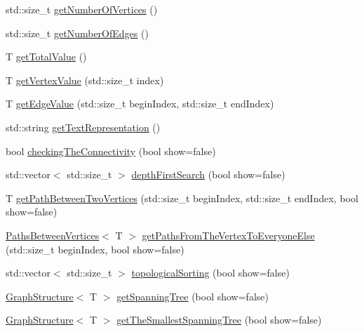 \begin{DoxyCompactItemize}
std\+::size\+\_\+t \mbox{\hyperlink{classgs_1_1_graph_structure_a973bb790243cd98bceac6188a79f47d6}{get\+Number\+Of\+Vertices}} ()
\item 
std\+::size\+\_\+t \mbox{\hyperlink{classgs_1_1_graph_structure_ab7f63de5d83e392689eb9e10f776c848}{get\+Number\+Of\+Edges}} ()
\item 
T \mbox{\hyperlink{classgs_1_1_graph_structure_a430f8d15cb01da7f7c7054b7a9e831ee}{get\+Total\+Value}} ()
\item 
T \mbox{\hyperlink{classgs_1_1_graph_structure_a0adafe2cbe3eb635da12957b9b0ad803}{get\+Vertex\+Value}} (std\+::size\+\_\+t index)
\item 
T \mbox{\hyperlink{classgs_1_1_graph_structure_ac2e23f51a131b5a08d96cb8c75f20cea}{get\+Edge\+Value}} (std\+::size\+\_\+t begin\+Index, std\+::size\+\_\+t end\+Index)
\item 
std\+::string \mbox{\hyperlink{classgs_1_1_graph_structure_afbecaabb4707e21a0018556100384e8f}{get\+Text\+Representation}} ()
\item 
bool \mbox{\hyperlink{classgs_1_1_graph_structure_a969a88dd678fd5b16884a6ab2cb68a60}{checking\+The\+Connectivity}} (bool show=false)
\item 
std\+::vector$<$ std\+::size\+\_\+t $>$ \mbox{\hyperlink{classgs_1_1_graph_structure_a6a9516f3f46cbbcdc50741e342a22ae4}{depth\+First\+Search}} (bool show=false)
\item 
T \mbox{\hyperlink{classgs_1_1_graph_structure_ac144d278d9b8a2d1bf0c4b59c0146348}{get\+Path\+Between\+Two\+Vertices}} (std\+::size\+\_\+t begin\+Index, std\+::size\+\_\+t end\+Index, bool show=false)
\item 
\mbox{\hyperlink{structpbv_1_1_paths_between_vertices}{Paths\+Between\+Vertices}}$<$ T $>$ \mbox{\hyperlink{classgs_1_1_graph_structure_a32134a6cd71384928dfd6e52794e12ff}{get\+Paths\+From\+The\+Vertex\+To\+Everyone\+Else}} (std\+::size\+\_\+t begin\+Index, bool show=false)
\item 
std\+::vector$<$ std\+::size\+\_\+t $>$ \mbox{\hyperlink{classgs_1_1_graph_structure_aaaccde89d753affe1ca96ad3a25a03b0}{topological\+Sorting}} (bool show=false)
\item 
\mbox{\hyperlink{classgs_1_1_graph_structure}{Graph\+Structure}}$<$ T $>$ \mbox{\hyperlink{classgs_1_1_graph_structure_adb32325d5e18eaf7bec12e6fc64e93c9}{get\+Spanning\+Tree}} (bool show=false)
\item 
\mbox{\hyperlink{classgs_1_1_graph_structure}{Graph\+Structure}}$<$ T $>$ \mbox{\hyperlink{classgs_1_1_graph_structure_a84565337bd8e3ca9a22512b3e7d0e4fb}{get\+The\+Smallest\+Spanning\+Tree}} (bool show=false)
\end{DoxyCompactItemize}


